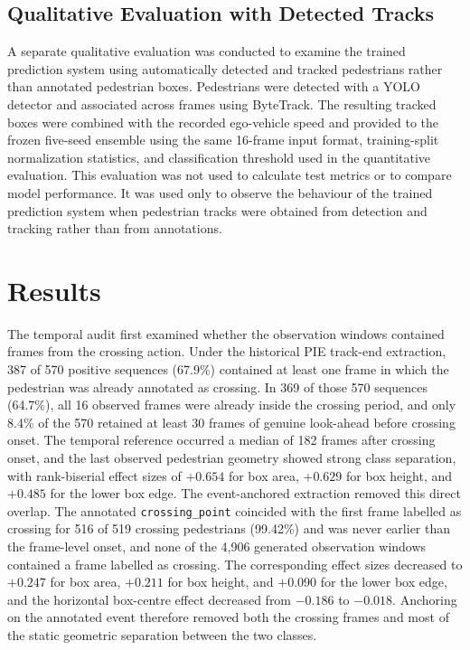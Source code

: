 \documentclass[mti,article,submit,moreauthors]{Definitions/mdpi}
\begin{document}
\subsection{Qualitative Evaluation with Detected Tracks}

A separate qualitative evaluation was conducted to examine the trained prediction system using automatically detected and tracked pedestrians rather than annotated pedestrian boxes. Pedestrians were detected with a YOLO detector and associated across frames using ByteTrack. The resulting tracked boxes were combined with the recorded ego-vehicle speed and provided to the frozen five-seed ensemble using the same 16-frame input format, training-split normalization statistics, and classification threshold used in the quantitative evaluation. This evaluation was not used to calculate test metrics or to compare model performance. It was used only to observe the behaviour of the trained prediction system when pedestrian tracks were obtained from detection and tracking rather than from annotations.


\section{Results}\label{sec:results}

The temporal audit first examined whether the observation windows contained frames from the crossing action. Under the historical PIE track-end extraction, 387 of 570 positive sequences (67.9\%) contained at least one frame in which the pedestrian was already annotated as crossing. In 369 of those 570 sequences (64.7\%), all 16 observed frames were already inside the crossing period, and only 8.4\% of the 570 retained at least 30 frames of genuine look-ahead before crossing onset. The temporal reference occurred a median of 182 frames after crossing onset, and the last observed pedestrian geometry showed strong class separation, with rank-biserial effect sizes of $+0.654$ for box area, $+0.629$ for box height, and $+0.485$ for the lower box edge. The event-anchored extraction removed this direct overlap. The annotated \texttt{crossing\_point} coincided with the first frame labelled as crossing for 516 of 519 crossing pedestrians (99.42\%) and was never earlier than the frame-level onset, and none of the 4,906 generated observation windows contained a frame labelled as crossing. The corresponding effect sizes decreased to $+0.247$ for box area, $+0.211$ for box height, and $+0.090$ for the lower box edge, and the horizontal box-centre effect decreased from $-0.186$ to $-0.018$. Anchoring on the annotated event therefore removed both the crossing frames and most of the static geometric separation between the two classes.
\end{document}
